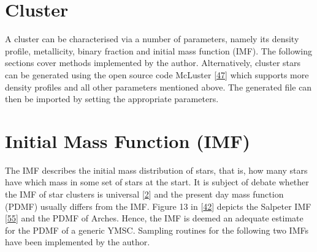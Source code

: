 \documentclass[letterpaper,10pt,english]{sphinxmanual}
\begin{document}
\section{Cluster}
\label{\detokenize{NBodySimulation/Initialization:cluster}}
\sphinxAtStartPar
A cluster can be characterised via a number of parameters, namely its density profile, metallicity, binary fraction and initial mass function (IMF).
The following sections cover methods implemented by the author. Alternatively, cluster stars can be generated using the open source code McLuster {[}\hyperlink{cite.NBodySimulation/Appendix:id35}{47}{]} which supports more density profiles and all other parameters mentioned above.
The generated file can then be imported by setting the appropriate parameters.


\section{Initial Mass Function (IMF)}
\label{\detokenize{NBodySimulation/Initialization:initial-mass-function-imf}}
\sphinxAtStartPar
The IMF describes the initial mass distribution of stars, that is, how many stars have which mass in some set of stars at the start.
It is subject of debate whether the IMF of star clusters is universal {[}\hyperlink{cite.NBodySimulation/Appendix:id45}{2}{]} and the present day mass function (PDMF) usually differs from the IMF.
Figure 13 in {[}\hyperlink{cite.NBodySimulation/Appendix:id44}{42}{]} depicts the Salpeter IMF {[}\hyperlink{cite.NBodySimulation/Appendix:id49}{55}{]} and the PDMF of Arches. Hence, the IMF is deemed an adequate estimate for the PDMF of a generic YMSC.
Sampling routines for the following two IMFs have been implemented by the author.
\end{document}
